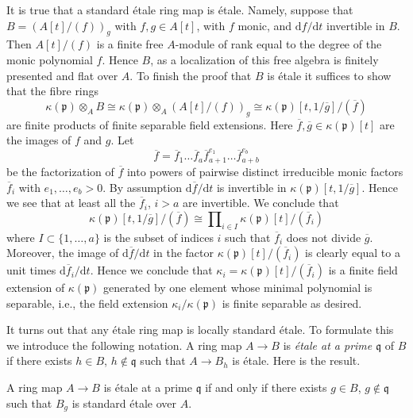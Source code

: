 \noindent
It is true that a standard \'etale ring map is \'etale. Namely, suppose
that $B = \left(A[t]/(f)\right)_g$ with $f, g \in A[t]$, with $f$ monic,
and $\text{d}f/\text{d}t$ invertible in $B$. Then $A[t]/(f)$ is a finite
free $A$-module of rank equal to the degree of the monic polynomial $f$.
Hence $B$, as a localization of this free algebra is finitely presented
and flat over $A$. To finish the proof that $B$ is \'etale it suffices
to show that the fibre rings
$$
\kappa(\mathfrak p) \otimes_A B
\cong
\kappa(\mathfrak p) \otimes_A (A[t]/(f))_g
\cong
\kappa(\mathfrak p)[t, 1/\overline{g}]/(\overline{f})
$$
are finite products of finite separable field extensions.
Here $\overline{f}, \overline{g} \in \kappa(\mathfrak p)[t]$ are
the images of $f$ and $g$. Let
$$
\overline{f} = \overline{f}_1 \ldots \overline{f}_a
\overline{f}_{a + 1}^{e_1} \ldots \overline{f}_{a + b}^{e_b}
$$
be the factorization of $\overline{f}$ into powers of pairwise distinct
irreducible monic factors $\overline{f}_i$ with $e_1, \ldots, e_b > 0$.
By assumption $\text{d}\overline{f}/\text{d}t$ is invertible in
$\kappa(\mathfrak p)[t, 1/\overline{g}]$. Hence we see that
at least all the $\overline{f}_i$, $i > a$ are invertible. We conclude
that
$$
\kappa(\mathfrak p)[t, 1/\overline{g}]/(\overline{f})
\cong
\prod\nolimits_{i \in I} \kappa(\mathfrak p)[t]/(\overline{f}_i)
$$
where $I \subset \{1, \ldots, a\}$ is the subset of indices $i$ such that
$\overline{f}_i$ does not divide $\overline{g}$. Moreover, the image of
$\text{d}\overline{f}/\text{d}t$ in the factor
$\kappa(\mathfrak p)[t]/(\overline{f}_i)$ is clearly equal to a
unit times $\text{d}\overline{f}_i/\text{d}t$. Hence we conclude that
$\kappa_i = \kappa(\mathfrak p)[t]/(\overline{f}_i)$ is a finite field
extension of $\kappa(\mathfrak p)$ generated by one element whose
minimal polynomial is separable, i.e., the field extension
$\kappa_i/\kappa(\mathfrak p)$ is finite separable as desired.

\medskip\noindent
It turns out that any \'etale ring map is locally standard \'etale.
To formulate this we introduce the following notation.
A ring map $A \to B$ is {\it \'etale at a prime $\mathfrak q$} of $B$ if there
exists $h \in B$, $h \not \in \mathfrak q$ such that $A \to B_h$ is \'etale.
Here is the result.

\begin{theorem}
\label{theorem-standard-etale}
A ring map $A \to B$ is \'etale at a prime $\mathfrak q$ if and only if there
exists $g \in B$, $g \not \in \mathfrak q$ such that $B_g$ is standard
\'etale over $A$.
\end{theorem}

